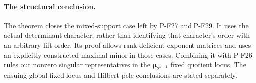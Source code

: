 \paragraph{The structural conclusion.}
The theorem closes the mixed-support case left by
P-F27 and P-F29. It uses the actual determinant
character, rather than identifying that character's
order with an arbitrary lift order. Its proof
allows rank-deficient exponent matrices and uses
an explicitly constructed maximal minor in those
cases. Combining it with P-F26 rules out
nonzero singular representatives in the
$\boldsymbol\mu_{2^{n-1}}$ fixed quotient locus.
The ensuing global fixed-locus and Hilbert-pole
conclusions are stated separately.
